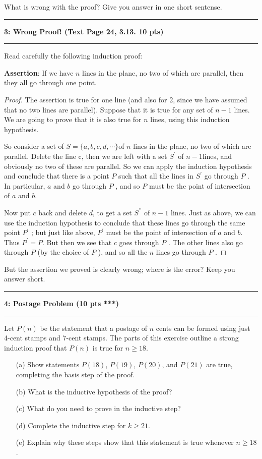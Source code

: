 \documentclass[11pt]{article}
\newcommand\question[2]{\vspace{.25in}\hrule\textbf{#1: #2}\vspace{.5em}\hrule\vspace{.10in}}
\DeclareMathOperator*{\dprime}{{\prime \prime}}
\begin{document}
What is wrong with the proof? Give you answer in one short sentense.

\question{3}{Wrong Proof! (Text Page 24, 3.13. 10 pts)}
Read carefully the following induction proof:

\textbf{Assertion}: If we have $n$ lines in the plane, no two of which are parallel, then they all go through one point.
\begin{proof}
The assertion is true for one line (and also for 2, since we have assumed that no two lines are parallel). Suppose that it is true for any set of $n-1$ lines. We are going to prove that it is also true for $n$ lines, using this induction hypothesis.

So consider a set of $S = \{a, b, c, d,\cdots\} $of $n$ lines in the plane, no two of which are parallel. Delete the line c, then we are left with a set $S^{\prime}$ of $n-1$lines, and obviously no two of these are parallel. So we can apply the induction hypothesis and conclude that there is a point $P$ such that all the lines in $S^{\prime}$ go through $P$ . In particular, $a$ and $b$ go through $P$ , and so $P$ must be the point of intersection of $a$ and $b$.

Now put $c$ back and delete $d$, to get a set $S^{\dprime}$ of $n-1$ lines. Just as above, we can use the induction hypothesis to conclude that these lines go through the same point $P^{\prime}$ ; but
just like above, $P^\prime$ must be the point of intersection of $a$ and $b$. Thus $P^\prime = P$. But then we see that $c$ goes through $P$ . The other lines also go through $P$ (by the choice of $P$ ), and so all the $n$ lines go through $P$ .
\end{proof}

But the assertion we proved is clearly wrong; where is the error? Keep you answer short.


\question{4}{Postage Problem (10 pts ***)}
Let $P(n)$ be the statement that a postage of $n$ cents can be
formed using just 4-cent stamps and 7-cent stamps. The parts of this exercise outline a strong induction proof that $P(n)$ is true for $n\geq 18$.

\begin{enumerate}
    \item[(a)]  Show statements $P(18)$, $P(19)$, $P(20)$, and $P(21)$
are true, completing the basis step of the proof.
    \item[(b)] What is the inductive hypothesis of the proof?
    \item[(c)] What do you need to prove in the inductive step?
    \item[(d)] Complete the inductive step for $k\geq 21$.
     \item[(e)] Explain why these steps show that this statement is
true whenever $n\geq 18$.
\end{enumerate}
\end{document}

